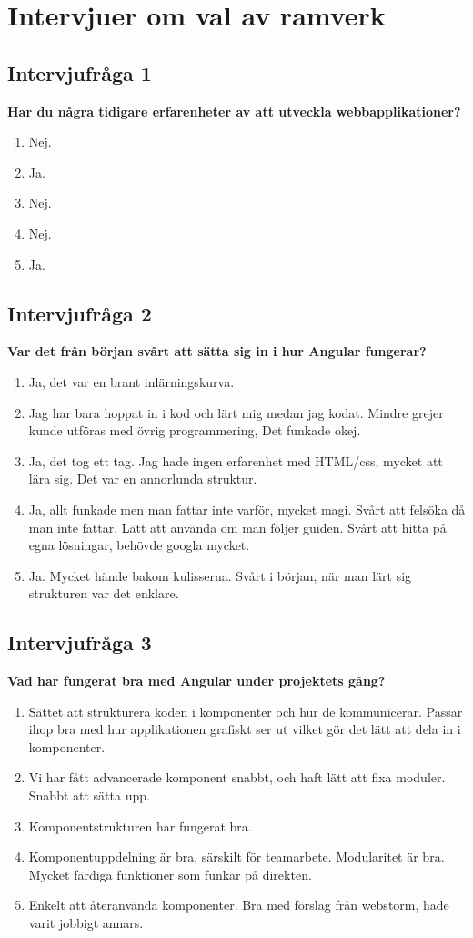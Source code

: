 \chapter{Intervjuer om val av ramverk}\label{appendix:martin}

\section{Intervjufråga 1}
\textbf{Har du några tidigare erfarenheter av att utveckla webbapplikationer?}
\begin{enumerate}
\item Nej.
\item Ja.
\item Nej.
\item Nej.
\item Ja.
\end{enumerate}

\section{Intervjufråga 2}
\textbf{Var det från början svårt att sätta sig in i hur Angular fungerar?}
\begin{enumerate}
\item Ja, det var en brant inlärningskurva. 
\item Jag har bara hoppat in i kod och lärt mig medan jag kodat. Mindre grejer kunde utföras med övrig programmering, Det funkade okej.
\item Ja, det tog ett tag. Jag hade ingen erfarenhet med HTML/css, mycket att lära sig. Det var en annorlunda struktur.
\item Ja, allt funkade men man fattar inte varför, mycket magi. Svårt att felsöka då man inte fattar. Lätt att använda om man följer guiden. Svårt att hitta på egna lösningar, behövde googla mycket.
\item Ja. Mycket hände bakom kulisserna. Svårt i början, när man lärt sig strukturen var det enklare.
\end{enumerate}

\section{Intervjufråga 3}
\textbf{Vad har fungerat bra med Angular under projektets gång?}
\begin{enumerate}
\item Sättet att strukturera koden i komponenter och hur de kommunicerar. Passar ihop bra med hur applikationen grafiskt ser ut vilket gör det lätt att dela in i komponenter.
\item Vi har fått advancerade komponent snabbt, och haft lätt att fixa moduler. Snabbt att sätta upp.
\item Komponentstrukturen har fungerat bra.
\item Komponentuppdelning  är bra, särskilt för teamarbete. Modularitet är bra. Mycket färdiga funktioner som funkar på direkten.
\item Enkelt att återanvända komponenter. Bra med förslag från webstorm, hade varit jobbigt annars.
\end{enumerate}

